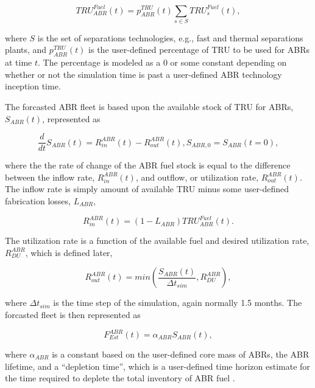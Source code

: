 \begin{equation*}
 TRU^{Fuel}_{ABR}(t) = p^{TRU}_{ABR}(t) \sum_{s \in S} TRU^{Fuel}_s(t),
\end{equation*}

where $S$ is the set of separations technologies, e.g., fast and thermal
separations plants, and $p^{TRU}_{ABR}(t)$ is the user-defined percentage of TRU
to be used for ABRs at time $t$. The percentage is modeled as a 0 or some
constant depending on whether or not the simulation time is past a user-defined
ABR technology inception time. 

The forcasted ABR fleet is based upon the available stock of TRU for ABRs,
$S_{ABR}(t)$, represented as

\begin{equation*}
 \frac{d}{dt}S_{ABR}(t) = R_{in}^{ABR}(t) - R_{out}^{ABR}(t), S_{ABR,0} = S_{ABR}(t=0),
\end{equation*}

where the the rate of change of the ABR fuel stock is equal to the difference
between the inflow rate, $R_{in}^{ABR}(t)$, and outflow, or utilization rate,
$R_{out}^{ABR}(t)$. The inflow rate is simply amount of available TRU minus some
user-defined fabrication losses, $L_{ABR}$,

\begin{equation*}
 R_{in}^{ABR}(t) = \left( 1 - L_{ABR} \right) TRU^{Fuel}_{ABR}(t).
\end{equation*}

The utilization rate is a function of the available fuel and desired utilization
rate, $R^{ABR}_{DU}$, which is defined later,

\begin{equation*}
 R_{out}^{ABR}(t) = min \left( \frac{S_{ABR}(t)}{\Delta t_{sim}}, R^{ABR}_{DU}\right),
\end{equation*}

where $\Delta t_{sim}$ is the time step of the simulation, again normally 1.5
months. The forcasted fleet is then represented as

\begin{equation*}
 F_{Est}^{ABR}(t) = \alpha_{ABR} S_{ABR}(t),
\end{equation*}

where $\alpha_{ABR}$ is a constant based on the user-defined core mass of ABRs,
the ABR lifetime, and a ``depletion time'', which is a user-defined time horizon
estimate for the time required to deplete the total inventory of ABR
fuel \cite{busquim_e_silva_system_2008}.

